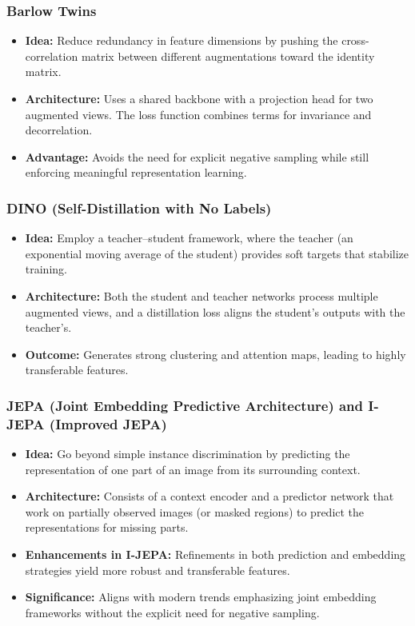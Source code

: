 \documentclass{article}
\begin{document}
\subsubsection{Barlow Twins}
\begin{itemize}
    \item \textbf{Idea:} Reduce redundancy in feature dimensions by pushing the cross-correlation matrix between different augmentations toward the identity matrix.
    \item \textbf{Architecture:} Uses a shared backbone with a projection head for two augmented views. The loss function combines terms for invariance and decorrelation.
    \item \textbf{Advantage:} Avoids the need for explicit negative sampling while still enforcing meaningful representation learning.
\end{itemize}

\subsubsection{DINO (Self-Distillation with No Labels)}
\begin{itemize}
    \item \textbf{Idea:} Employ a teacher--student framework, where the teacher (an exponential moving average of the student) provides soft targets that stabilize training.
    \item \textbf{Architecture:} Both the student and teacher networks process multiple augmented views, and a distillation loss aligns the student’s outputs with the teacher’s.
    \item \textbf{Outcome:} Generates strong clustering and attention maps, leading to highly transferable features.
\end{itemize}

\subsubsection{JEPA (Joint Embedding Predictive Architecture) and I-JEPA (Improved JEPA)}
\begin{itemize}
    \item \textbf{Idea:} Go beyond simple instance discrimination by predicting the representation of one part of an image from its surrounding context.
    \item \textbf{Architecture:} Consists of a context encoder and a predictor network that work on partially observed images (or masked regions) to predict the representations for missing parts.
    \item \textbf{Enhancements in I-JEPA:} Refinements in both prediction and embedding strategies yield more robust and transferable features.
    \item \textbf{Significance:} Aligns with modern trends emphasizing joint embedding frameworks without the explicit need for negative sampling.
\end{itemize}
\end{document}
